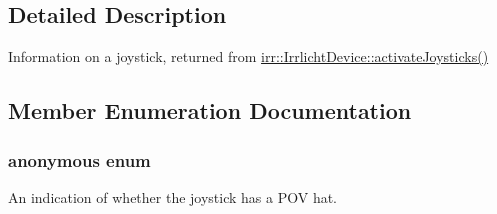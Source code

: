 \subsection{Detailed Description}
Information on a joystick, returned from \hyperlink{classirr_1_1IrrlichtDevice_af06f8d2c4fdffd1f879e46685bcbc6e3}{irr\+::\+Irrlicht\+Device\+::activate\+Joysticks()} 

\subsection{Member Enumeration Documentation}
\subsubsection[{\texorpdfstring{anonymous enum}{anonymous enum}}]{\setlength{\rightskip}{0pt plus 5cm}anonymous enum}\hypertarget{structirr_1_1SJoystickInfo_a5ab1b9b6969289f70b321d3c3657d999}{}\label{structirr_1_1SJoystickInfo_a5ab1b9b6969289f70b321d3c3657d999}


An indication of whether the joystick has a P\+OV hat. 

